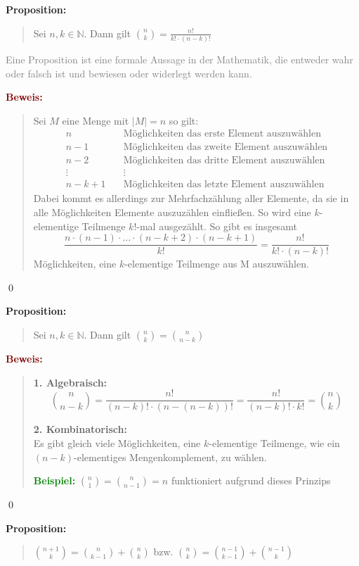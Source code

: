 \documentclass{article}
\newcommand{\gray}[1]{\textcolor{gray}{#1}}
\newcommand{\green}[1]{\textcolor{green}{#1}}
\newcommand{\dgr}[1]{\textcolor{dgr}{#1}}
\newcommand{\maroon}[1]{\textcolor{maroon}{#1}}
\newcommand{\ex}{\green{\textbf{Beispiel: }}}
\newcommand{\prop}[1]{\dgr{\textbf{Proposition: }}\begin{quote}#1\end{quote}}
\newcommand{\pr}[1]{\maroon{\textbf{Beweis: }}\begin{quote}#1\end{quote}\qed}
\newcommand{\N}{\mathbb{N}}
\begin{document}
\newpage

\prop{Sei $n, k \in \N$. Dann gilt $\binom{n}{k} = \frac{n!}{k! \cdot (n - k)!}$}
\gray{Eine Proposition ist eine formale Aussage in der Mathematik, die entweder wahr oder falsch ist und bewiesen oder widerlegt werden kann.}

\pr{
    Sei $M$ eine Menge mit $|M| = n$ so gilt:
    \begin{equation*}
        \begin{aligned}
            n         &\quad \text{Möglichkeiten das erste Element auszuwählen}\\
            n - 1     &\quad \text{Möglichkeiten das zweite Element auszuwählen}\\
            n - 2     &\quad \text{Möglichkeiten das dritte Element auszuwählen}\\
               \vdots &\quad \vdots\\
            n - k + 1 &\quad \text{Möglichkeiten das letzte Element auszuwählen}
        \end{aligned}
    \end{equation*}
    Dabei kommt es allerdings zur Mehrfachzählung aller Elemente, da sie in alle Möglichkeiten Elemente auszuzählen einfließen. So wird eine $k$-elementige Teilmenge $k!$-mal ausgezählt. So gibt es insgesamt
    \begin{equation*}
        \frac{n \cdot (n - 1) \cdot \dots \cdot (n - k + 2) \cdot (n - k + 1)}{k!} = \frac{n!}{k! \cdot (n - k)!}
    \end{equation*}
    Möglichkeiten, eine $k$-elementige Teilmenge aus M auszuwählen.
}

\prop{Sei $n, k \in \N$. Dann gilt $\binom{n}{k} = \binom{n}{n - k}$}

\pr{
    \textbf{1. Algebraisch:}
    \begin{equation*}
        \binom{n}{n-k} = \frac{n!}{(n - k)! \cdot (n - (n - k))!} = \frac{n!}{(n - k)! \cdot k!} = \binom{n}{k}
    \end{equation*}

    \textbf{2. Kombinatorisch:}\\
    Es gibt gleich viele Möglichkeiten, eine $k$-elementige Teilmenge, wie ein $(n - k)$-elementiges Mengenkomplement, zu wählen.

    \ex $\binom{n}{1} = \binom{n}{n - 1} = n$ funktioniert aufgrund dieses Prinzips
}

\newpage

\prop{
    $\binom{n + 1}{k} = \binom{n}{k - 1} + \binom{n}{k}$ bzw. $\binom{n}{k} = \binom{n-1}{k-1} + \binom{n-1}{k}$
    }
\end{document}
